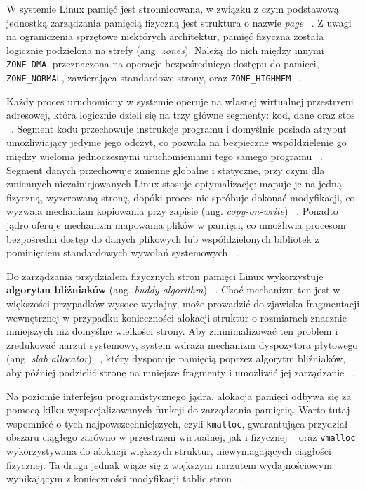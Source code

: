 W systemie Linux pamięć jest stronnicowana, w związku z czym podstawową jednostką zarządzania pamięcią fizyczną jest struktura o nazwie \textit{page} ~\cite{LinuxKernelDevelopment}. Z uwagi na ograniczenia sprzętowe niektórych architektur, pamięć fizyczna została logicznie podzielona na strefy (ang. \textit{zones}). Należą do nich między innymi \texttt{ZONE\_DMA}, przeznaczona na operacje bezpośredniego dostępu do pamięci, \texttt{ZONE\_NORMAL}, zawierająca standardowe strony, oraz \texttt{ZONE\_HIGHMEM} ~\cite{Tanenbaum}. 

Każdy proces uruchomiony w systemie operuje na własnej wirtualnej przestrzeni adresowej, która logicznie dzieli się na trzy główne segmenty: kod, dane oraz stos ~\cite{Tanenbaum}. Segment kodu przechowuje instrukcje programu i domyślnie posiada atrybut umożliwiający jedynie jego odczyt, co pozwala na bezpieczne współdzielenie go między wieloma jednoczesnymi uruchomieniami tego samego programu ~\cite{Abraham_Silberschatz}. Segment danych przechowuje zmienne globalne i statyczne, przy czym dla zmiennych niezainicjowanych  Linux stosuje optymalizację: mapuje je na jedną fizyczną, wyzerowaną stronę, dopóki proces nie spróbuje dokonać modyfikacji, co wyzwala mechanizm kopiowania przy zapisie (ang. \textit{copy-on-write}) ~\cite{Tanenbaum}. Ponadto jądro oferuje mechanizm mapowania plików w pamięci, co umożliwia procesom bezpośredni dostęp do danych plikowych lub współdzielonych bibliotek z pominięciem standardowych wywołań systemowych ~\cite{Tanenbaum}.

Do zarządzania przydziałem fizycznych stron pamięci Linux wykorzystuje \textbf{algorytm bliźniaków} (ang. \textit{buddy algorithm}) ~\cite{Tanenbaum}. Choć mechanizm ten jest w większości przypadków wysoce wydajny, może prowadzić do zjawiska fragmentacji wewnętrznej w przypadku konieczności alokacji struktur o rozmiarach znacznie mniejszych niż domyślne wielkości strony. Aby zminimalizować ten problem i zredukować narzut systemowy, system wdraża mechanizm dyspozytora płytowego (ang. \textit{slab allocator}) ~\cite{LinuxKernelDevelopment}, który dysponuje pamięcią poprzez algorytm bliźniaków, aby później podzielić stronę na mniejsze fragmenty i umożliwić jej zarządzanie ~\cite{Tanenbaum}. 

Na poziomie interfejsu programistycznego jądra, alokacja pamięci odbywa się za pomocą kilku wyspecjalizowanych funkcji do zarządzania pamięcią. Warto tutaj wspomnieć o tych najpowszechniejszych, czyli \texttt{kmalloc}, gwarantująca przydział obszaru ciągłego zarówno w przestrzeni wirtualnej, jak i fizycznej ~\cite{LinuxKernelDevelopment} oraz \texttt{vmalloc} wykorzystywana do alokacji większych struktur, niewymagających ciągłości fizycznej. Ta druga jednak wiąże się  z  większym narzutem wydajnościowym wynikającym z konieczności modyfikacji tablic stron ~\cite{LinuxKernelDevelopment}.
